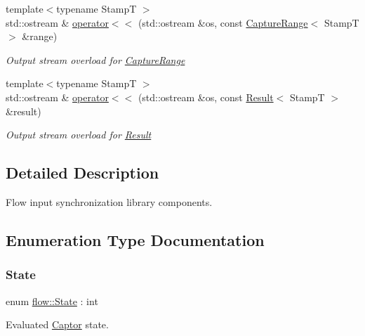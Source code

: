 \begin{DoxyCompactItemize}
{\footnotesize template$<$typename StampT $>$ }\\std\+::ostream \& \hyperlink{namespaceflow_a8423b9d75e853c9c36724474ba20d63a}{operator$<$$<$} (std\+::ostream \&os, const \hyperlink{structflow_1_1_capture_range}{Capture\+Range}$<$ StampT $>$ \&range)
\begin{DoxyCompactList}\small\item\em Output stream overload for {\ttfamily \hyperlink{structflow_1_1_capture_range}{Capture\+Range}} \end{DoxyCompactList}\item 
{\footnotesize template$<$typename StampT $>$ }\\std\+::ostream \& \hyperlink{namespaceflow_a7ca1e3a34fdc4e532e45869d9141c53a}{operator$<$$<$} (std\+::ostream \&os, const \hyperlink{structflow_1_1_result}{Result}$<$ StampT $>$ \&result)
\begin{DoxyCompactList}\small\item\em Output stream overload for {\ttfamily \hyperlink{structflow_1_1_result}{Result}} \end{DoxyCompactList}\end{DoxyCompactItemize}


\subsection{Detailed Description}
Flow input synchronization library components. 

\subsection{Enumeration Type Documentation}
\mbox{\label{namespaceflow_adefe9726e597eb50c46f0f6a202018e9}} 
\subsubsection{\texorpdfstring{State}{State}}
{\footnotesize\ttfamily enum \hyperlink{namespaceflow_adefe9726e597eb50c46f0f6a202018e9}{flow\+::\+State} \+: int\hspace{0.3cm}{\ttfamily [strong]}}



Evaluated \hyperlink{classflow_1_1_captor}{Captor} state. 

